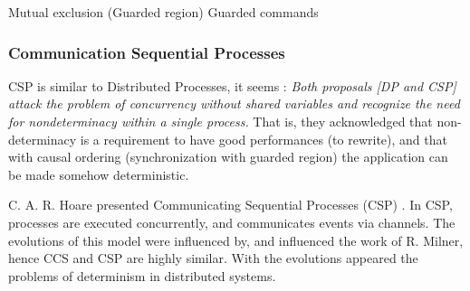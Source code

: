 Mutual exclusion (Guarded region) \cite{Hansen1978a} \cite{Hoare2002}
Guarded commands \cite{Dijkstra1975}

\subsubsection{Communication Sequential Processes}

CSP is similar to Distributed Processes, it seems :
\textit{Both proposals [DP and CSP] attack the problem of concurrency without shared variables and recognize the need for nondeterminacy within a single process.}
That is, they acknowledged that non-determinacy is a requirement to have good performances (to rewrite), and that with causal ordering (synchronization with guarded region) the application can be made somehow deterministic.

C. A. R. Hoare presented Communicating Sequential Processes (CSP) \cite{Hoare1978, Brookes1984}.
In CSP, processes are executed concurrently, and communicates events via channels.
The evolutions of this model were influenced by, and influenced the work of R. Milner, hence CCS and CSP are highly similar.
With the evolutions appeared the problems of determinism in distributed systems.\cite{Brookes1984}











